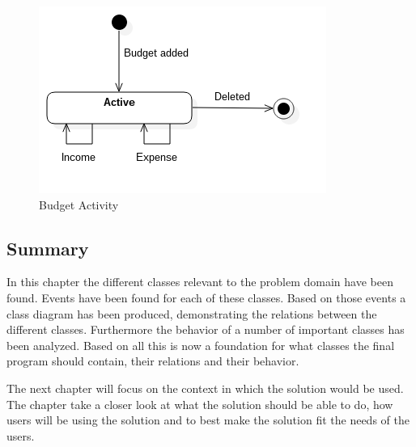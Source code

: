\begin{figure}[H]
    \centering
    \includegraphics[scale=0.6]{Images/ProblemDomain/budgetActivityDiagram.png}
    \caption{Budget Activity}
    \label{fig:budgetActivityDiagram}
\end{figure}
















\subsection{Summary}

In this chapter the different classes relevant to the problem domain have been found. Events have been found for each of these classes. 
Based on those events a class diagram has been produced, demonstrating the relations between the different classes. Furthermore the behavior of a number of important classes has been analyzed. Based on all this is now a foundation for what classes the final program should contain, their relations and their behavior.

The next chapter will focus on the context in which the solution would be used. The chapter take a closer look at what the solution should be able to do, how users will be using the solution and to best make the solution fit the needs of the users.














